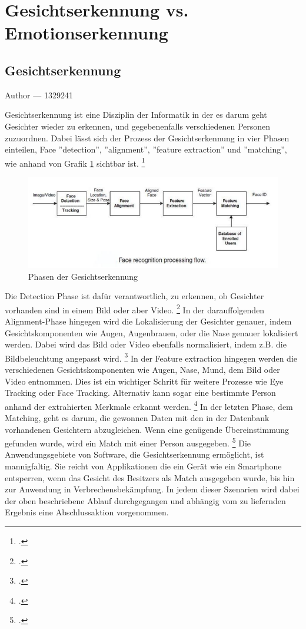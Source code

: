 \documentclass[12pt, a4paper]{report}
\makeatletter
\newcommand*\setcaptioncitation[1]{\def\captioncitation{\textit{Quelle:}~#1}}
\let\captioncitation\relax
\newcommand{\sectionauthor}[1]{%
  {\parindent0pt\vspace*{-5pt}%
  \large{Author --- }
  \linespread{1.1}\large\scshape#1%
  \par\nobreak\vspace*{35pt} }
  \@afterheading%
}
\makeatother
\begin{document}
\section{Gesichtserkennung vs. Emotionserkennung}

\subsection{Gesichtserkennung}
\sectionauthor{1329241}
Gesichtserkennung ist eine Disziplin der Informatik in der es darum geht Gesichter wieder zu erkennen, und gegebenenfalls verschiedenen Personen zuzuordnen. Dabei lässt sich der Prozess der Gesichtserkennung in vier Phasen einteilen, Face ''detection'', ''alignment'', ''feature extraction'' und ''matching'', wie anhand von Grafik \ref{fig:Face Recognition} sichtbar ist.
\footcite[Vgl. ][2]{HandbookFaceRec}
\begin{figure}[h]
\includegraphics[width=\linewidth]{Bilder/FaceRecognition.png}
\setcaptioncitation{ https://alitarhini.files.wordpress.com/2010/12/untitled1.png}
\caption{ Phasen der Gesichtserkennung}
\label{fig:Face Recognition}
\end{figure}
Die Detection Phase ist dafür verantwortlich, zu erkennen, ob Gesichter vorhanden sind in einem Bild oder aber Video.
\footcite[Vgl. ][2]{HandbookFaceRec}
In der darauffolgenden Alignment-Phase hingegen wird die Lokalisierung der Gesichter genauer, indem Gesichtskomponenten wie Augen, Augenbrauen, oder die Nase genauer lokalisiert werden. Dabei wird das Bild oder Video ebenfalls normalisiert, indem z.B. die Bildbeleuchtung angepasst wird.
\footcite[Vgl. ][2]{HandbookFaceRec}
In der Feature extraction hingegen werden die verschiedenen Gesichtskomponenten wie Augen, Nase, Mund, dem Bild oder Video entnommen. Dies ist ein wichtiger Schritt für weitere Prozesse wie Eye Tracking oder Face Tracking. Alternativ kann sogar eine bestimmte Person anhand der extrahierten Merkmale erkannt werden.
\footcite[Vgl. ][Abstract]{IEEE}
In der letzten Phase, dem Matching, geht es darum, die gewonnen Daten mit den in der Datenbank vorhandenen Gesichtern abzugleichen. Wenn eine genügende Übereinstimmung gefunden wurde, wird ein Match mit einer Person ausgegeben.
\footcite[Vgl. ][3]{HandbookFaceRec}
Die Anwendungsgebiete von Software, die Gesichtserkennung ermöglicht, ist mannigfaltig. Sie reicht von Applikationen die ein Gerät wie ein Smartphone entsperren, wenn das Gesicht des Besitzers als Match ausgegeben wurde, bis hin zur Anwendung in Verbrechensbekämpfung. In jedem dieser Szenarien wird dabei der oben beschriebene Ablauf durchgegangen und abhängig vom zu liefernden Ergebnis eine Abschlussaktion vorgenommen.
\end{document}
